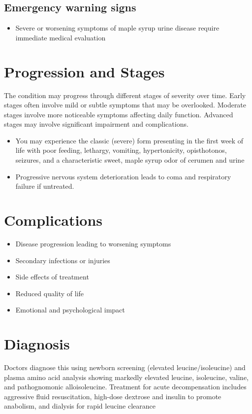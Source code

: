 \subsection{Emergency warning signs}
\begin{itemize}[noitemsep]
  \item Severe or worsening symptoms of maple syrup urine disease require immediate medical evaluation
\end{itemize}
\section{Progression and Stages}
The condition may progress through different stages of severity over time. Early stages often involve mild or subtle symptoms that may be overlooked. Moderate stages involve more noticeable symptoms affecting daily function. Advanced stages may involve significant impairment and complications.

\begin{itemize}[noitemsep]
  \item You may experience the classic (severe) form presenting in the first week of life with poor feeding, lethargy, vomiting, hypertonicity, opisthotonos, seizures, and a characteristic sweet, maple syrup odor of cerumen and urine
  \item Progressive nervous system deterioration leads to coma and respiratory failure if untreated.
\end{itemize}
\section{Complications}
\begin{itemize}[noitemsep]
  \item Disease progression leading to worsening symptoms
  \item Secondary infections or injuries
  \item Side effects of treatment
  \item Reduced quality of life
  \item Emotional and psychological impact
\end{itemize}
\section{Diagnosis}
Doctors diagnose this using newborn screening (elevated leucine/isoleucine) and plasma amino acid analysis showing markedly elevated leucine, isoleucine, valine, and pathognomonic alloisoleucine. Treatment for acute decompensation includes aggressive fluid resuscitation, high-dose dextrose and insulin to promote anabolism, and dialysis for rapid leucine clearance

